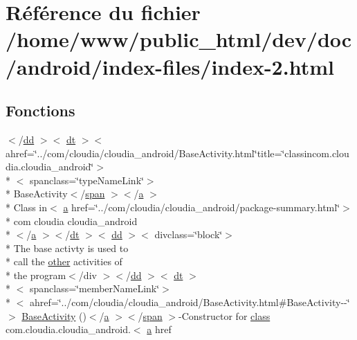 \hypertarget{index-2_8html}{\section{Référence du fichier /home/www/public\-\_\-html/dev/doc/android/index-\/files/index-\/2.html}
\label{index-2_8html}
}
\subsection*{Fonctions}
\begin{DoxyCompactItemize}
\item 
$<$/\hyperlink{stylesheet_8css_a47f4718a86835a7771ec592ece845221}{dd} $>$$<$ \hyperlink{stylesheet_8css_a107565fb4039d33b041380d6e0ea1d80}{dt} $>$$<$ ahref=\char`\"{}../com/cloudia/cloudia\-\_\-android/Base\-Activity.\-html\char`\"{}title=\char`\"{}classincom.\-cloudia.\-cloudia\-\_\-android\char`\"{}$>$\\*
$<$ spanclass=\char`\"{}type\-Name\-Link\char`\"{}$>$\\*
 Base\-Activity$<$/\hyperlink{stylesheet_8css_a8343996ebcf16220b04e54659aac31cc}{span} $>$$<$/\hyperlink{style_8css_a5e8981582017bb8b84c21f148345d1f7}{a} $>$\\*
 Class in$<$ \hyperlink{style_8css_a5e8981582017bb8b84c21f148345d1f7}{a} href=\char`\"{}../com/cloudia/cloudia\-\_\-android/package-\/summary.\-html\char`\"{}$>$\\*
 com cloudia cloudia\-\_\-android\\*
$<$/\hyperlink{style_8css_a5e8981582017bb8b84c21f148345d1f7}{a} $>$$<$/\hyperlink{stylesheet_8css_a107565fb4039d33b041380d6e0ea1d80}{dt} $>$$<$ \hyperlink{stylesheet_8css_a47f4718a86835a7771ec592ece845221}{dd} $>$$<$ divclass=\char`\"{}block\char`\"{}$>$\\*
 The base activty is used to \\*
call the \hyperlink{stations_8js_a1a21d2720e349a4ca9cf88d5a2687f85}{other} activities of \\*
the program$<$/div $>$$<$/\hyperlink{stylesheet_8css_a47f4718a86835a7771ec592ece845221}{dd} $>$$<$ \hyperlink{stylesheet_8css_a107565fb4039d33b041380d6e0ea1d80}{dt} $>$\\*
$<$ spanclass=\char`\"{}member\-Name\-Link\char`\"{}$>$\\*
$<$ ahref=\char`\"{}../com/cloudia/cloudia\-\_\-android/Base\-Activity.\-html\#Base\-Activity-\/-\/\char`\"{}$>$ \hyperlink{index-2_8html_a61e95a6a9edfa0964ff3438abd1581e4}{Base\-Activity} ()$<$/\hyperlink{style_8css_a5e8981582017bb8b84c21f148345d1f7}{a} $>$$<$/\hyperlink{stylesheet_8css_a8343996ebcf16220b04e54659aac31cc}{span} $>$-\/Constructor for \hyperlink{_tools_8html_acf06f836132665ba8114f5a414c2403f}{class} com.\-cloudia.\-cloudia\-\_\-android.$<$ \hyperlink{style_8css_a5e8981582017bb8b84c21f148345d1f7}{a} href
$$
\end{DoxyCompactItemize}

